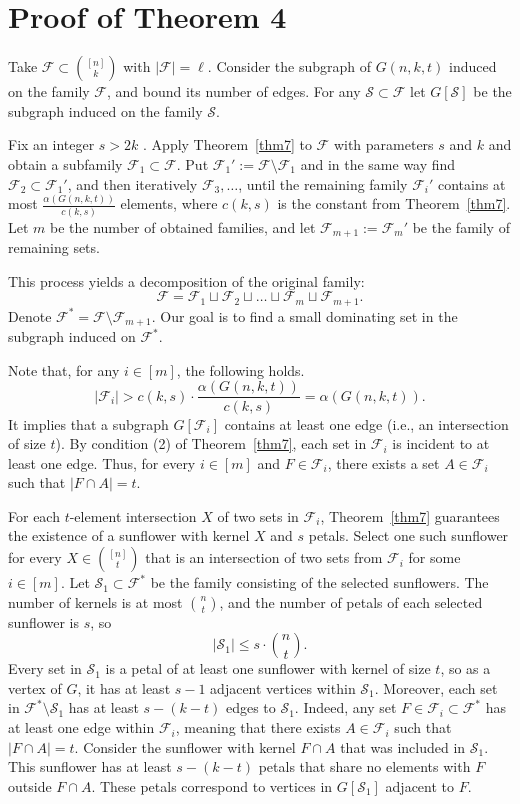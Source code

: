\documentclass[12pt,a4paper]{article}
\newcommand{\ff}{\mathcal{F}}
\begin{document}
\section{Proof of Theorem 4}\label{sec3}

Take $\ff \subset \binom{[n]}{k}$ with $|\ff| = \ell.$ Consider the subgraph of $G(n,k,t)$ induced on the family $\mathcal{F}$, and bound its number of edges. For any $\mathcal{S} \subset \ff$ let $G[\mathcal{S}]$ be the subgraph induced on the family $\mathcal{S}$.


Fix an integer $s > 2k$ . Apply Theorem~\ref{thm7} to $\mathcal{F}$ with parameters $s$ and $k$ and obtain a subfamily $\mathcal{F}_1 \subset \mathcal{F}$. Put $\ff_1' :=\ff \setminus \ff_1$ and in the same way find $\mathcal{F}_2 \subset \ff_1'$, and then iteratively $\ff_3, \ldots$, until the remaining family $\ff_i'$ contains at most $\frac{\alpha(G(n,k,t))}{c(k,s)}$ elements, where $c(k,s)$ is the constant from Theorem~\ref{thm7}. Let $m$ be the number of obtained families, and let $\mathcal{F}_{m+1} := \ff_m'$ be the family of remaining sets.

This process yields a decomposition of the original family:
\[
\mathcal{F} = \mathcal{F}_1 \sqcup \mathcal{F}_2 \sqcup \ldots \sqcup \mathcal{F}_m \sqcup \mathcal{F}_{m+1}.
\]
Denote $\mathcal{F}^* = \mathcal{F} \setminus \mathcal{F}_{m+1}$. Our goal is to find a small dominating set in the subgraph induced on $\mathcal{F}^*$. 

Note that, for any $i \in [m]$, the following holds.
\[
|\mathcal{F}_i| > c(k,s) \cdot \frac{\alpha(G(n,k,t))}{c(k,s)} = \alpha(G(n,k,t)).
\]
It implies that a subgraph $G[\ff_i]$ contains at least one edge (i.e., an intersection of size $t$). By condition (2) of Theorem~\ref{thm7}, each set in $\mathcal{F}_i$ is incident to at least one edge. Thus, for every $i \in [m]$ and $F \in \mathcal{F}_i$, there exists a set $A \in \mathcal{F}_i$ such that $|F \cap A| = t$.

For each $t$-element intersection $X$ of two sets in $\mathcal{F}_i$, Theorem~\ref{thm7} guarantees the existence of a sunflower with kernel $X$ and $s$ petals. Select one such sunflower for every $X \in \binom{[n]}{t}$ that is an intersection of two sets from $\ff_i$ for some $i \in [m]$. Let $\mathcal{S}_1 \subset \mathcal{F}^*$ be the family consisting of the selected sunflowers. The number of kernels is at most $\binom{n}{t}$, and the number of petals of each selected sunflower is $s$, so
\[
|\mathcal{S}_1| \leqslant s \cdot \binom{n}{t}.
\]
Every set in $\mathcal{S}_1$ is a petal of at least one sunflower with kernel of size $t$, so as a vertex of $G$, it has at least $s-1$ adjacent vertices within $\mathcal{S}_1$. Moreover, each set in $\mathcal{F}^* \setminus \mathcal{S}_1$ has at least $s - (k-t)$ edges to $\mathcal{S}_1$. Indeed, any set $F \in \mathcal{F}_i \subset \mathcal{F}^*$ has at least one edge within $\mathcal{F}_i$, meaning that there exists $A \in \mathcal{F}_i$ such that $|F \cap A| = t$. Consider the sunflower with kernel $F \cap A$ that was included in $\mathcal{S}_1$. This sunflower has at least $s - (k-t)$ petals that share no elements with $F$ outside $F \cap A$. These petals correspond to vertices in $G[\mathcal{S}_1]$ adjacent to $F$.
\end{document}
